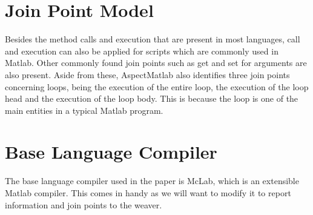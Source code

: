 \documentclass[a4paper]{report}
\begin{document}
\section{Join Point Model}
Besides the method calls and execution that are present in most languages, call and execution can also be applied for scripts which are commonly used in Matlab. Other commonly found join points such as get and set for arguments are also present. Aside from these, AspectMatlab also identifies three join points concerning loops, being the execution of the entire loop, the execution of the loop head and the execution of the loop body. This is because the loop is one of the main entities in a typical Matlab program.

\section{Base Language Compiler}
The base language compiler used in the paper is McLab, which is an extensible Matlab compiler. This comes in handy as we will want to modify it to report information and join points to the weaver.
\end{document}
